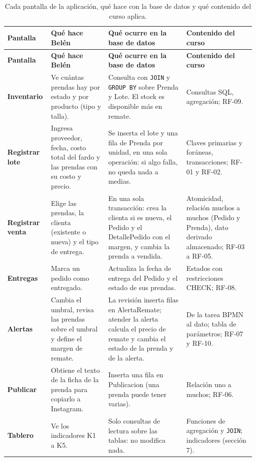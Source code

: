 \documentclass[11pt,letterpaper]{article}
\begin{document}
{\scriptsize
\setlength{\tabcolsep}{3pt}\renewcommand{\arraystretch}{1.15}
\begin{longtable}{>{\raggedright\arraybackslash}p{}>{\raggedright\arraybackslash}p{}>{\raggedright\arraybackslash}p{}>{\raggedright\arraybackslash}p{}}
\caption{Cada pantalla de la aplicación, qué hace con la base de datos y qué contenido del curso aplica.}\\
\hline
\rowcolor[HTML]{D9EAF7}\textbf{\textbf{Pantalla}} & \textbf{\textbf{Qué hace Belén}} & \textbf{\textbf{Qué ocurre en la base de datos}} & \textbf{\textbf{Contenido del curso}} \\
\hline
\endfirsthead
\hline
\rowcolor[HTML]{D9EAF7}\textbf{\textbf{Pantalla}} & \textbf{\textbf{Qué hace Belén}} & \textbf{\textbf{Qué ocurre en la base de datos}} & \textbf{\textbf{Contenido del curso}} \\
\hline
\endhead
\textbf{Inventario} & Ve cuántas prendas hay por estado y por producto (tipo y talla). & Consulta con \texttt{JOIN} y \texttt{GROUP BY} sobre Prenda y Lote. El stock es disponible más en remate. & Consultas SQL, agregación; RF-09. \\
\hline
\textbf{Registrar lote} & Ingresa proveedor, fecha, costo total del fardo y las prendas con su costo y precio. & Se inserta el lote y una fila de Prenda por unidad, en una sola operación: si algo falla, no queda nada a medias. & Claves primarias y foráneas, transacciones; RF-01 y RF-02. \\
\hline
\textbf{Registrar venta} & Elige las prendas, la clienta (existente o nueva) y el tipo de entrega. & En una sola transacción: crea la clienta si es nueva, el Pedido y el DetallePedido con el margen, y cambia la prenda a vendida. & Atomicidad, relación muchos a muchos (Pedido y Prenda), dato derivado almacenado; RF-03 a RF-05. \\
\hline
\textbf{Entregas} & Marca un pedido como entregado. & Actualiza la fecha de entrega del Pedido y el estado de sus prendas. & Estados con restricciones CHECK; RF-08. \\
\hline
\textbf{Alertas} & Cambia el umbral, revisa las prendas sobre el umbral y define el margen de remate. & La revisión inserta filas en AlertaRemate; atender la alerta calcula el precio de remate y cambia el estado de la prenda y de la alerta. & De la tarea BPMN al dato; tabla de parámetros; RF-07 y RF-10. \\
\hline
\textbf{Publicar} & Obtiene el texto de la ficha de la prenda para copiarlo a Instagram. & Inserta una fila en Publicacion (una prenda puede tener varias). & Relación uno a muchos; RF-06. \\
\hline
\textbf{Tablero} & Ve los indicadores K1 a K5. & Solo consultas de lectura sobre las tablas: no modifica nada. & Funciones de agregación y \texttt{JOIN}; indicadores (sección 7). \\
\hline
\end{longtable}
}
\end{document}
